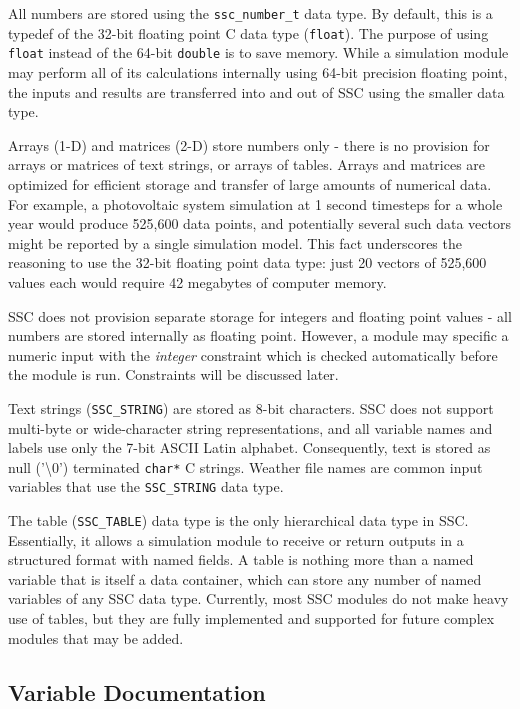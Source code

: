 \documentclass{article}
\begin{document}
All numbers are stored using the \texttt{ssc\_number\_t} data type.  By default, this is a typedef of the 32-bit floating point C data type (\texttt{float}).  The purpose of using \texttt{float} instead of the 64-bit \texttt{double} is to save memory.  While a simulation module may perform all of its calculations internally using 64-bit precision floating point, the inputs and results are transferred into and out of SSC using the smaller data type.

Arrays (1-D) and matrices (2-D) store numbers only - there is no provision for arrays or matrices of text strings, or arrays of tables.  Arrays and matrices are optimized for efficient storage and transfer of large amounts of numerical data.  For example, a photovoltaic system simulation at 1 second timesteps for a whole year would produce 525,600 data points, and potentially several such data vectors might be reported by a single simulation model.  This fact underscores the reasoning to use the 32-bit floating point data type: just 20 vectors of 525,600 values each would require 42 megabytes of computer memory.

SSC does not provision separate storage for integers and floating point values - all numbers are stored internally as floating point.  However, a module may specific a numeric input with the \emph{integer} constraint which is checked automatically before the module is run.  Constraints will be discussed later.

Text strings (\texttt{SSC\_STRING})  are stored as 8-bit characters.  SSC does not support multi-byte or wide-character string representations, and all variable names and labels use only the 7-bit ASCII Latin alphabet.  Consequently, text is stored as null ('\textbackslash 0') terminated \texttt{char*} C strings.  Weather file names are common input variables that use the \texttt{SSC\_STRING} data type.

The table (\texttt{SSC\_TABLE}) data type is the only hierarchical data type in SSC.  Essentially, it allows a simulation module to receive or return outputs in a structured format with named fields.  A table is nothing more than a named variable that is itself a data container, which can store any number of named variables of any SSC data type.  Currently, most SSC modules do not make heavy use of tables, but they are fully implemented and supported for future complex modules that may be added.

\subsection{Variable Documentation}
\end{document}

